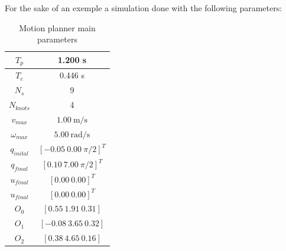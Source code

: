 
For the sake of an exemple a simulation done with the following parameters:
\begin{table}[!h]
\caption {Motion planner main parameters} \label{tab:s3param}
\begin{center}
\begin{tabular}{|c|c|}
\hline
$T_p$ & 1.200 s\\
\hline 
$T_c$ & 0.446 s\\
\hline 
$N_s$ & 9\\
\hline 
$N_{knots}$ & 4\\
\hline
$v_{max}$ & $1.00\ \mathrm{m/s}$\\
\hline
$\omega_{max}$ & $5.00\ \mathrm{rad/s}$\\
\hline
$q_{inital}$ & $[-0.05\ 0.00\ \pi/2]^T$\\
\hline
$q_{final}$ & $[0.10\ 7.00\ \pi/2]^T$\\
\hline
$u_{final}$ & $[0.00\ 0.00]^T$\\
\hline
$u_{final}$ & $[0.00\ 0.00]^T$\\
\hline
$O_0$ & $[0.55\ 1.91\ 0.31]$\\
\hline
$O_1$ & $[-0.08\ 3.65\ 0.32]$\\
\hline
$O_2$ & $[0.38\ 4.65\ 0.16]$\\
\hline
\end{tabular}
\end{center}
\end{table}

